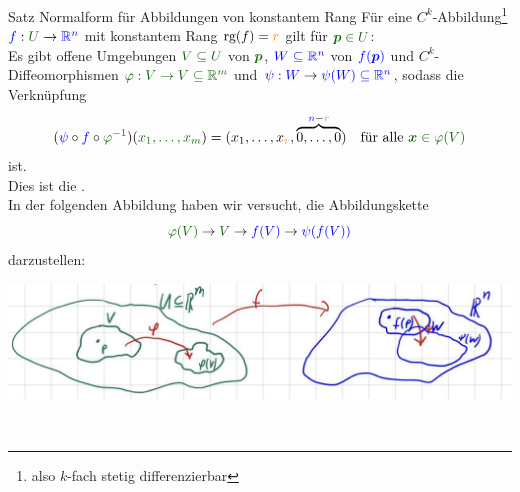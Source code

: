 \begin{Satz}{Satz}
{Normalform für Abbildungen von konstantem Rang}
Für eine $C^k$-Abbildung\footnote{also $k$-fach stetig differenzierbar} $\textcolor{blue}{f}:\textcolor{mygreen}{U}\to\textcolor{blue}{\mathbb{R}^n}$ mit konstantem Rang $\text{rg}(f)=\textcolor{orange}{r}$ gilt für $\textcolor{mygreen}{\pvec\in U}$:\\
Es gibt offene Umgebungen $\textcolor{mygreen}{V\subseteq U}$ von $\textcolor{mygreen}{\pvec}$, $\textcolor{blue}{W\subseteq \mathbb{R}^n}$ von $\textcolor{blue}{f({{\text{\boldmath${p}$}}})}$ und $C^k$-Diffeomorphismen $\textcolor{mygreen}{\varphi:V\to V\subseteq\mathbb{R}^m}$ und $\textcolor{blue}{\psi:W}\to\textcolor{blue}{\psi(W)\subseteq\mathbb{R}^n}$, sodass die Verknüpfung
\begin{equation*}
    (\textcolor{blue}{\psi}\circ\textcolor{blue}{ f}\circ\textcolor{mygreen}{\varphi^{-1}})(\textcolor{mygreen}{x_1,\ldots,x_m})=(x_1,\ldots, x_{\textcolor{orange}{r}},\overbrace{0,\ldots,0}^{\textcolor{blue}{n}-\textcolor{orange}{r}})\quad\tx{für alle }\textcolor{mygreen}{\xvec\in \varphi(V)}
\end{equation*}
ist.\\
Dies ist die .\\
In der folgenden Abbildung haben wir versucht, die Abbildungskette
\begin{equation*}
    \textcolor{mygreen}{\varphi(V)}\to \textcolor{mygreen}{V}\to \textcolor{blue}{f(V)}\to\textcolor{blue}{\psi(f(V))}
\end{equation*}
darzustellen:
\begin{center}
    \includegraphics[width=.5\textwidth]{Dateien/10/10Normalform.jpg}
\end{center}
\end{Satz}
\\
